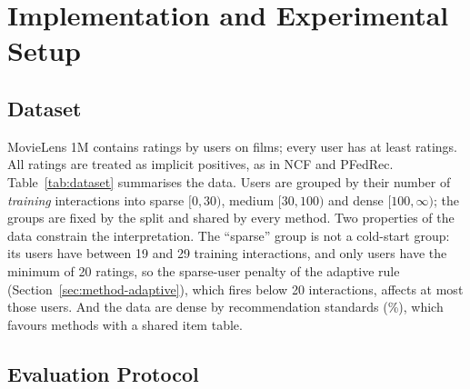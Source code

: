 \chapter{Implementation and Experimental Setup}
\label{ch:setup}

\section{Dataset}
\label{sec:setup-data}

MovieLens 1M \cite{harper2015movielens} contains \DsRatings{} ratings by \DsUsers{} users on
\DsItems{} films; every user has at least \DsMinRatings{} ratings. All ratings are treated as
implicit positives, as in NCF and PFedRec. Table~\ref{tab:dataset} summarises the data. Users are
grouped by their number of \emph{training} interactions into sparse $[0, 30)$, medium $[30,
100)$ and dense $[100, \infty)$; the groups are fixed by the split and shared by every method.
Two properties of the data constrain the interpretation. The ``sparse'' group is not a cold-start
group: its users have between 19 and 29 training interactions, and only \DsExactlyTwenty{} users
have the minimum of 20 ratings, so the sparse-user penalty of the adaptive rule
(Section~\ref{sec:method-adaptive}), which fires below 20 interactions, affects at most those
users. And the data are dense by recommendation standards (\DsDensity\%), which favours methods
with a shared item table.

\begin{table}[htbp]
  \caption{MovieLens 1M statistics and user groups.}
  \label{tab:dataset}
  \centering\small
  \fittable{}
\end{table}

\section{Evaluation Protocol}
\label{sec:setup-protocol}

